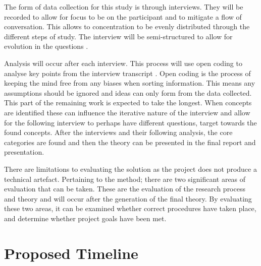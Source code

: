 \par The form of data collection for this study is through interviews. They will be recorded to allow for focus to be on the participant and to mitigate a flow of conversation. This allows to concentration to be evenly distributed through the different steps of study. The interview will be semi-structured to allow for evolution in the questions \cite{geeks}. 
\newline
\par Analysis will occur after each interview. This process will use open coding to analyse key points from the interview transcript \cite{geeks}. Open coding is the process of keeping the mind free from any biases when sorting information. This means any assumptions should be ignored and ideas can only form from the data collected. This part of the remaining work is expected to take the longest. When concepts are identified these can influence the iterative nature of the interview and allow for the following interview to perhaps have different questions, target towards the found concepts. After the interviews and their following analysis, the core categories are found and then the theory can be presented in the final report and presentation. 
\newline
\par 
There are limitations to evaluating the solution as the project does not produce a technical artefact. Pertaining to the method; there are two significant areas of evaluation that can be taken. These are the evaluation of the research process and theory and will occur after the generation of the final theory. By evaluating these two areas, it can be examined whether correct procedures have taken place, and determine whether project goals have been met.
 
\section{Proposed Timeline}

